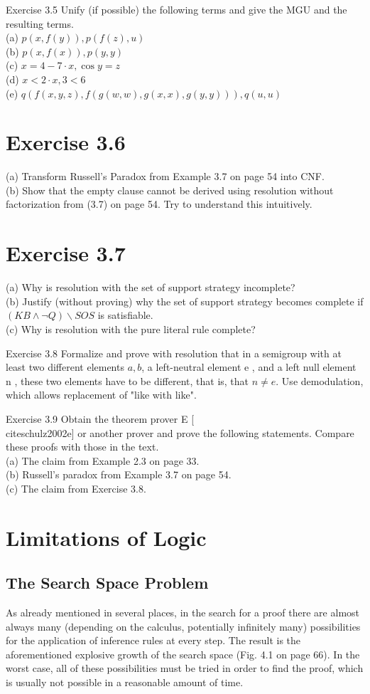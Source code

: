 \documentclass[10pt]{book}
\begin{document}
Exercise 3.5 Unify (if possible) the following terms and give the MGU and the resulting terms.\\
(a) $p(x, f(y)), p(f(z), u)$\\
(b) $p(x, f(x)), p(y, y)$\\
(c) $x=4-7 \cdot x, \cos y=z$\\
(d) $x<2 \cdot x, 3<6$\\
(e) $q(f(x, y, z), f(g(w, w), g(x, x), g(y, y))), q(u, u)$

\section*{Exercise 3.6}
(a) Transform Russell's Paradox from Example 3.7 on page 54 into CNF.\\
(b) Show that the empty clause cannot be derived using resolution without factorization from (3.7) on page 54. Try to understand this intuitively.

\section*{Exercise 3.7}
(a) Why is resolution with the set of support strategy incomplete?\\
(b) Justify (without proving) why the set of support strategy becomes complete if $(K B \wedge \neg Q) \backslash S O S$ is satisfiable.\\
(c) Why is resolution with the pure literal rule complete?

Exercise 3.8 Formalize and prove with resolution that in a semigroup with at least two different elements $a, b$, a left-neutral element e , and a left null element n , these two elements have to be different, that is, that $n \neq e$. Use demodulation, which allows replacement of "like with like".

Exercise 3.9 Obtain the theorem prover E [\\cite{schulz2002e}] or another prover and prove the following statements. Compare these proofs with those in the text.\\
(a) The claim from Example 2.3 on page 33.\\
(b) Russell's paradox from Example 3.7 on page 54.\\
(c) The claim from Exercise 3.8.

\section*{Limitations of Logic}
\subsection*{The Search Space Problem}
As already mentioned in several places, in the search for a proof there are almost always many (depending on the calculus, potentially infinitely many) possibilities for the application of inference rules at every step. The result is the aforementioned explosive growth of the search space (Fig. 4.1 on page 66). In the worst case, all of these possibilities must be tried in order to find the proof, which is usually not possible in a reasonable amount of time.
\end{document}
